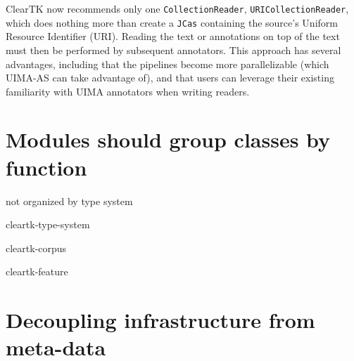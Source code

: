 \documentclass[10pt, a4paper]{article}
\newcommand{\code}[1]{\texttt{\small #1}}
\begin{document}
ClearTK now recommends only one \code{CollectionReader}, \code{URICollectionReader}, which does nothing more than create a \code{JCas} containing the source's Uniform Resource Identifier (URI).
Reading the text or annotations on top of the text must then be performed by subsequent annotators.
This approach has several advantages, including that the pipelines become more parallelizable (which UIMA-AS can take advantage of), and that users can leverage their existing familiarity with UIMA annotators when writing readers.

\section{Modules should group classes by function}
not organized by type system

cleartk-type-system

cleartk-corpus

cleartk-feature


\section{Decoupling infrastructure from meta-data}
\end{document}
